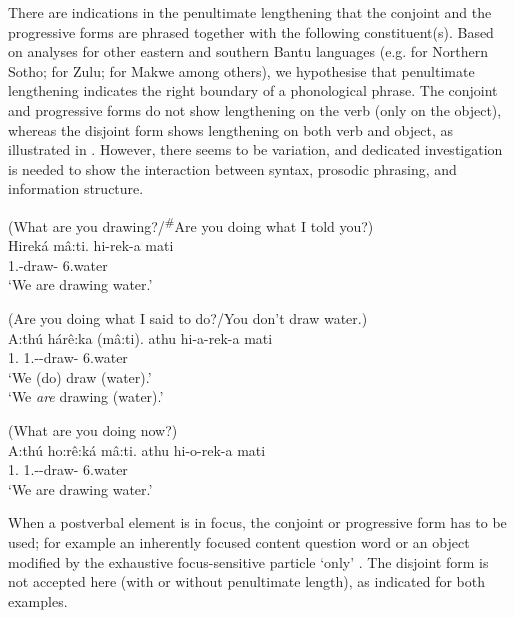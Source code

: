 \documentclass[output=paper]{langscibook}
\begin{document}
\z

There are indications in the penultimate lengthening that the conjoint and the progressive forms are phrased together with the following constituent(s). Based on analyses for other eastern and southern Bantu languages (e.g. \citealt{Zerbian2006} for Northern Sotho; \citealt{ZellerEtAl2017,Halpert2017} for Zulu; \citealt{Devos2008} for Makwe among others), we hypothesise that penultimate lengthening indicates the right boundary of a phonological phrase. The conjoint and progressive forms do not show lengthening on the verb (only on the object), whereas the disjoint form shows lengthening on both verb and object, as illustrated in . However, there seems to be variation, and dedicated investigation is needed to show the interaction between syntax, prosodic phrasing, and information structure.

\ea
\label{bkm:Ref120706029}
\ea
(What are you drawing?/\textsuperscript{\#}Are you doing what I told you?)\\
{Hireká mâ:ti.}\jambox*{[conjoint]}
\gll
hi-rek-a  mati\\
1\PL.\SM-draw-\FV{}  6.water\\
\glt ‘We are drawing water.’

\ex
(Are you doing what I said to do?/You don’t draw water.)\\
{A:thú hárê:ka (mâ:ti).}\jambox*{[disjoint]}
\gll
athu  hi-a-rek-a  mati\\
1\PL.\PRO{}  1\PL.\SM-\DJ-draw-\FV{}  6.water\\
\glt ‘We (do) draw (water).’\\
‘We \textit{are} drawing (water).’

\ex
(What are you doing now?)\\
{A:thú ho:rê:ká mâ:ti.}\jambox*{[progressive]}
\gll
athu  hi-o-rek-a  mati\\
1\PL.\PRO{}  1\PL.\SM{}-\PROG{}-draw-\FV{}  6.water\\
\glt ‘We are drawing water.’

\z
\z

When a postverbal element is in focus, the conjoint or progressive form has to be used; for example an inherently focused content question word  or an object modified by the exhaustive focus-sensitive particle ‘only’ . The disjoint form is not accepted here (with or without penultimate length), as indicated for both examples.
\end{document}
